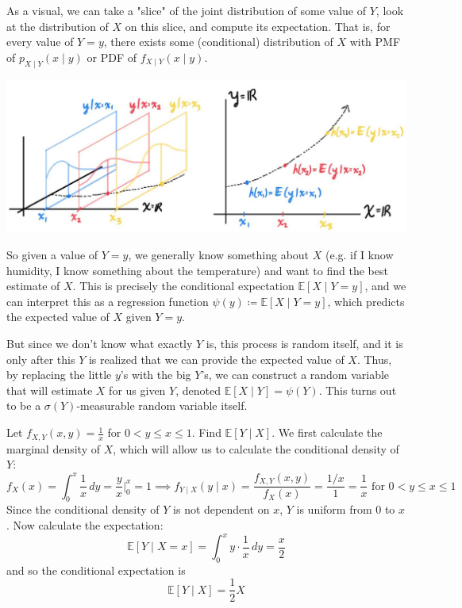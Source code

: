   As a visual, we can take a "slice" of the joint distribution of some value of $Y$, look at the distribution of $X$ on this slice, and compute its expectation. That is, for every value of $Y = y$, there exists some (conditional) distribution of $X$ with PMF of $p_{X \mid Y} (x \mid y)$ or PDF of $f_{X \mid Y} (x \mid y)$. 
  \begin{center}
    \includegraphics[scale=0.3]{img/conditional_exp.jpg}
  \end{center}
  So given a value of $Y = y$, we generally know something about $X$ (e.g. if I know humidity, I know something about the temperature) and want to find the best estimate of $X$. This is precisely the conditional expectation $\mathbb{E}[X \mid Y = y]$, and we can interpret this as a regression function $\psi(y) \coloneqq \mathbb{E}[X \mid Y = y]$, which predicts the expected value of $X$ given $Y = y$. 

  But since we don't know what exactly $Y$ is, this process is random itself, and it is only after this $Y$ is realized that we can provide the expected value of $X$. Thus, by replacing the little $y$'s with the big $Y$'s, we can construct a random variable that will estimate $X$ for us given $Y$, denoted $\mathbb{E}[X \mid Y] = \psi(Y)$. This turns out to be a $\sigma(Y)$-measurable random variable itself. 

  \begin{example}
    Let $f_{X, Y} (x, y) = \frac{1}{x}$ for $0 < y \leq x \leq 1$. Find $\mathbb{E}[Y \mid X]$. We first calculate the marginal density of $X$, which will allow us to calculate the conditional density of $Y$: 
    \begin{equation}
      f_X (x) = \int_0^x \frac{1}{x} \,dy = \frac{y}{x} \bigg|_0^x = 1 \implies f_{Y \mid X} (y \mid x) = \frac{f_{X, Y} (x, y)}{f_X (x)} = \frac{1/x}{1} = \frac{1}{x} \text{ for } 0 < y \leq x \leq 1
    \end{equation}
    Since the conditional density of $Y$ is not dependent on $x$, $Y$ is uniform from $0$ to $x$. Now calculate the expectation: 
    \begin{equation}
      \mathbb{E}[Y \mid X = x] = \int_0^x y \cdot \frac{1}{x} \,dy = \frac{x}{2}
    \end{equation}
    and so the conditional expectation is 
    \begin{equation}
      \mathbb{E}[Y \mid X] = \frac{1}{2} X
    \end{equation}
  \end{example}

